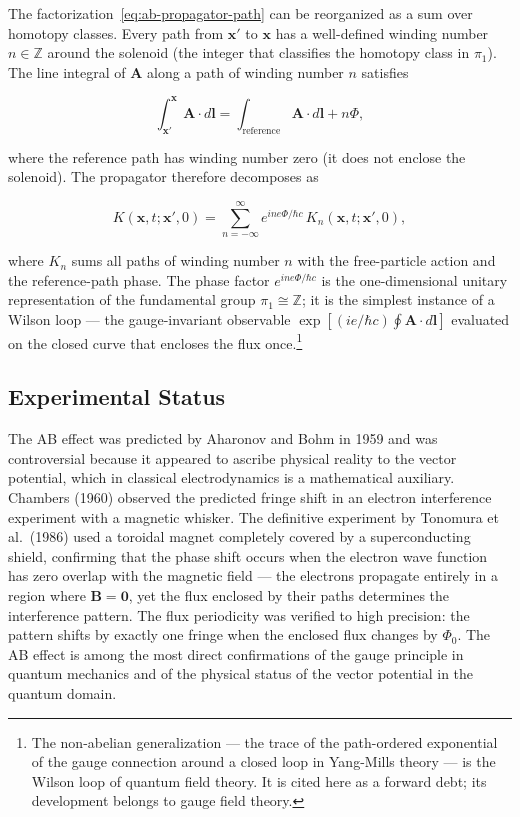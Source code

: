 The factorization~\eqref{eq:ab-propagator-path} can be reorganized as a sum over homotopy classes. Every path from $\bm x'$ to $\bm x$ has a well-defined winding number $n \in \mathbb{Z}$ around the solenoid (the integer that classifies the homotopy class in $\pi_1$). The line integral of $\bm A$ along a path of winding number $n$ satisfies
\begin{linenomath}
\begin{equation}
\int_{\bm x'}^{\bm x} \bm A\cdot d\bm l = \int_{\text{reference}} \bm A\cdot d\bm l + n\Phi,
\end{equation}
\end{linenomath}
where the reference path has winding number zero (it does not enclose the solenoid). The propagator therefore decomposes as
\begin{linenomath}
\begin{equation*}
K(\bm x,t;\bm x',0) = \sum_{n=-\infty}^{\infty} e^{i n e\Phi/\hbar c}\,K_n(\bm x,t;\bm x',0),
\end{equation*}
\end{linenomath}
where $K_n$ sums all paths of winding number $n$ with the free-particle action and the reference-path phase. The phase factor $e^{i n e\Phi/\hbar c}$ is the one-dimensional unitary representation of the fundamental group $\pi_1 \cong \mathbb{Z}$; it is the simplest instance of a Wilson loop --- the gauge-invariant observable $\exp[(ie/\hbar c)\oint \bm A\cdot d\bm l]$ evaluated on the closed curve that encloses the flux once.\footnote{The non-abelian generalization --- the trace of the path-ordered exponential of the gauge connection around a closed loop in Yang-Mills theory --- is the Wilson loop of quantum field theory. It is cited here as a forward debt; its development belongs to gauge field theory.}

\subsection{Experimental Status}

The AB effect was predicted by Aharonov and Bohm in 1959 and was controversial because it appeared to ascribe physical reality to the vector potential, which in classical electrodynamics is a mathematical auxiliary. Chambers (1960) observed the predicted fringe shift in an electron interference experiment with a magnetic whisker. The definitive experiment by Tonomura et al.\ (1986) used a toroidal magnet completely covered by a superconducting shield, confirming that the phase shift occurs when the electron wave function has zero overlap with the magnetic field --- the electrons propagate entirely in a region where $\bm B = \bm 0$, yet the flux enclosed by their paths determines the interference pattern. The flux periodicity was verified to high precision: the pattern shifts by exactly one fringe when the enclosed flux changes by $\Phi_0$. The AB effect is among the most direct confirmations of the gauge principle in quantum mechanics and of the physical status of the vector potential in the quantum domain.

